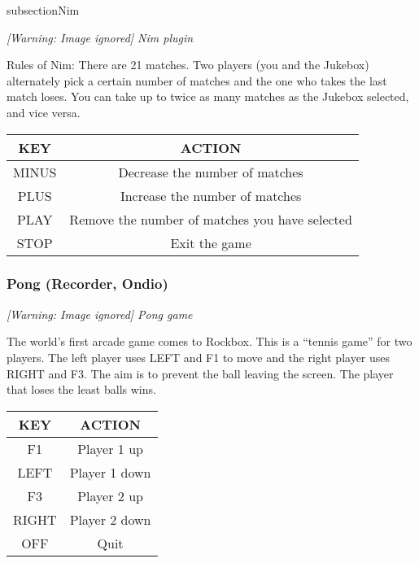 subsection{Nim}
{\centering\itshape
  [Warning: Image ignored] %
 \newline
Nim plugin
\par}

Rules of Nim: There are 21 matches. Two players (you and the Jukebox)
alternately pick a certain number of matches and the one who takes the
last match loses.  You can take up to twice as many matches as the
Jukebox selected, and vice versa. 

\begin{table}[h!]
\begin{center}
\begin{tabular}{|c|c|}
\hline
KEY & ACTION \\\hline
MINUS & Decrease the number of matches \\\hline
PLUS & Increase the number of matches \\\hline
PLAY & Remove the number of matches you have selected \\\hline
STOP & Exit the game \\\hline
\end{tabular}
\end{center}
\end{table}

\subsubsection{Pong (Recorder, Ondio)}
{\centering\itshape
  [Warning: Image ignored] %
 \newline
Pong game
\par}

The world's first arcade game comes to Rockbox.  This
is a ``tennis game'' for two players. The
left player uses LEFT and F1 to move and the right player uses RIGHT
and F3.  The aim is to prevent the ball leaving the screen.  The player
that loses the least balls wins.

\begin{table}[h!]
\begin{center}
\begin{tabular}{|c|c|}
\hline
KEY & ACTION \\\hline
F1 & Player 1 up \\\hline
LEFT & Player 1 down \\\hline
F3 & Player 2 up \\\hline
RIGHT & Player 2 down \\\hline
OFF & Quit \\\hline
\end{tabular}
\end{center}
\end{table}

